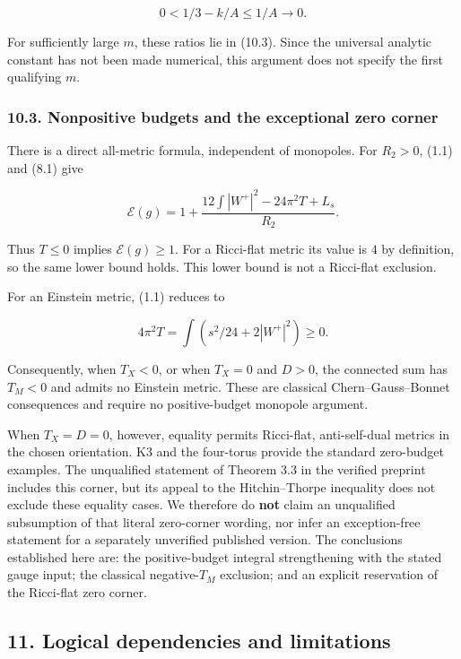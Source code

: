 \documentclass[
  11pt,
]{article}
\begin{document}
\[
                       0<1/3-k/A\le1/A\longrightarrow0.
\]

For sufficiently large \(m\), these ratios lie in (10.3). Since the
universal analytic constant has not been made numerical, this argument
does not specify the first qualifying \(m\).

\hypertarget{nonpositive-budgets-and-the-exceptional-zero-corner}{%
\subsubsection{10.3. Nonpositive budgets and the exceptional zero
corner}\label{nonpositive-budgets-and-the-exceptional-zero-corner}}

There is a direct all-metric formula, independent of monopoles. For
\(R_2>0\), (1.1) and (8.1) give

\[
 \mathcal E(g)
   =1+\frac{12\int|W^+|^2-24\pi^2T+L_s}{R_2}.           \tag{10.5}
\]

Thus \(T\le0\) implies \(\mathcal E(g)\ge1\). For a Ricci-flat metric
its value is \(4\) by definition, so the same lower bound holds. This
lower bound is not a Ricci-flat exclusion.

For an Einstein metric, (1.1) reduces to

\[
               4\pi^2T=\int(s^2/24+2|W^+|^2)\ge0.
\]

Consequently, when \(T_X<0\), or when \(T_X=0\) and \(D>0\), the
connected sum has \(T_M<0\) and admits no Einstein metric. These are
classical Chern--Gauss--Bonnet consequences and require no
positive-budget monopole argument.

When \(T_X=D=0\), however, equality permits Ricci-flat, anti-self-dual
metrics in the chosen orientation. K3 and the four-torus provide the
standard zero-budget examples. The unqualified statement of Theorem 3.3
in the verified preprint includes this corner, but its appeal to the
Hitchin--Thorpe inequality does not exclude these equality cases. We
therefore do \textbf{not} claim an unqualified subsumption of that
literal zero-corner wording, nor infer an exception-free statement for a
separately unverified published version. The conclusions established
here are: the positive-budget integral strengthening with the stated
gauge input; the classical negative-\(T_M\) exclusion; and an explicit
reservation of the Ricci-flat zero corner.

\hypertarget{logical-dependencies-and-limitations}{%
\subsection{11. Logical dependencies and
limitations}\label{logical-dependencies-and-limitations}}
\end{document}
